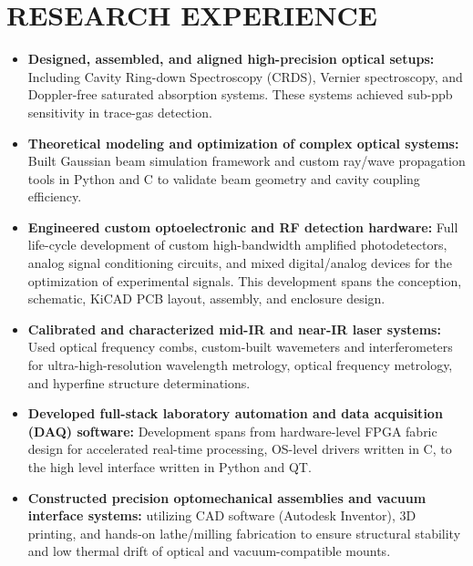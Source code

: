 \documentclass[a4paper,9pt]{extarticle}
\begin{document}
	\section*{RESEARCH EXPERIENCE}
	\begin{itemize}
		\item \textbf{Designed, assembled, and aligned high-precision optical setups:} \newline
		Including Cavity Ring-down Spectroscopy (CRDS), Vernier spectroscopy, and Doppler-free saturated absorption systems. These systems achieved sub-ppb sensitivity in trace-gas detection.
		
		\item \textbf{Theoretical modeling and optimization of complex optical systems:} \newline
		Built Gaussian beam simulation framework and custom ray/wave propagation tools in Python and C to validate beam geometry and cavity coupling efficiency.
		
		\item \textbf{Engineered custom optoelectronic and RF detection hardware:} \newline
		Full life-cycle development of custom high-bandwidth amplified photodetectors, analog signal conditioning circuits, and mixed digital/analog devices for the optimization of experimental signals. This development spans the conception, schematic, KiCAD PCB layout, assembly, and enclosure design.
		
		\item \textbf{Calibrated and characterized mid-IR and near-IR laser systems:} \newline
		Used optical frequency combs, custom-built wavemeters and interferometers for ultra-high-resolution wavelength metrology, optical frequency metrology, and hyperfine structure determinations.
		
		\item \textbf{Developed full-stack laboratory automation and data acquisition (DAQ) software:} \newline
		Development spans from hardware-level FPGA fabric design for accelerated real-time processing, OS-level drivers written in C, to the high level interface written in Python and QT.
		
		\item \textbf{Constructed precision optomechanical assemblies and vacuum interface systems:} \newline
		utilizing CAD software (Autodesk Inventor), 3D printing, and hands-on lathe/milling fabrication to ensure structural stability and low thermal drift of optical and vacuum-compatible mounts.
		

\end{itemize}
\end{document}
